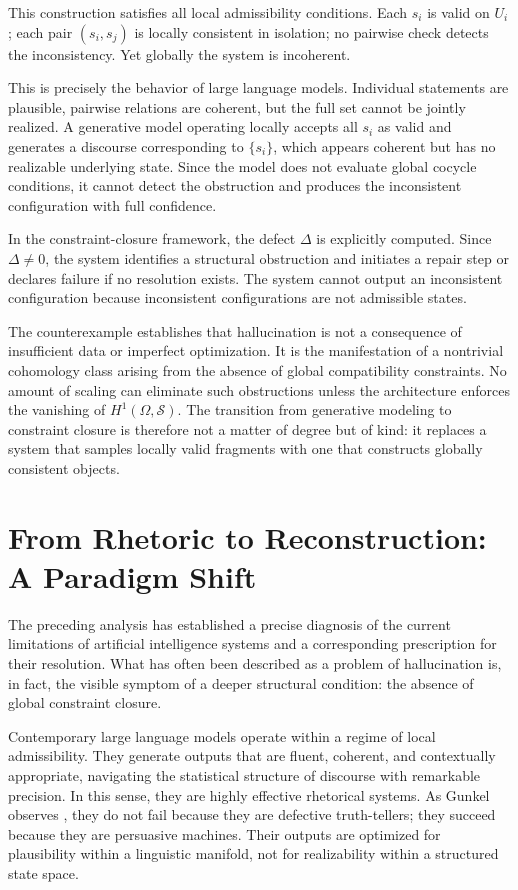 \documentclass[11pt, oneside]{article}
\begin{document}
This construction satisfies all local admissibility conditions. Each $s_i$ is valid on $U_i$; each pair $(s_i, s_j)$ is locally consistent in isolation; no pairwise check detects the inconsistency. Yet globally the system is incoherent.

This is precisely the behavior of large language models. Individual statements are plausible, pairwise relations are coherent, but the full set cannot be jointly realized. A generative model operating locally accepts all $s_i$ as valid and generates a discourse corresponding to $\{s_i\}$, which appears coherent but has no realizable underlying state. Since the model does not evaluate global cocycle conditions, it cannot detect the obstruction and produces the inconsistent configuration with full confidence.

In the constraint-closure framework, the defect $\Delta$ is explicitly computed. Since $\Delta \neq 0$, the system identifies a structural obstruction and initiates a repair step or declares failure if no resolution exists. The system cannot output an inconsistent configuration because inconsistent configurations are not admissible states.

The counterexample establishes that hallucination is not a consequence of insufficient data or imperfect optimization. It is the manifestation of a nontrivial cohomology class arising from the absence of global compatibility constraints. No amount of scaling can eliminate such obstructions unless the architecture enforces the vanishing of $H^1(\Omega, \mathcal{S})$. The transition from generative modeling to constraint closure is therefore not a matter of degree but of kind: it replaces a system that samples locally valid fragments with one that constructs globally consistent objects.

\section{From Rhetoric to Reconstruction: A Paradigm Shift}

The preceding analysis has established a precise diagnosis of the current limitations of artificial intelligence systems and a corresponding prescription for their resolution. What has often been described as a problem of hallucination is, in fact, the visible symptom of a deeper structural condition: the absence of global constraint closure.

Contemporary large language models operate within a regime of local admissibility. They generate outputs that are fluent, coherent, and contextually appropriate, navigating the statistical structure of discourse with remarkable precision. In this sense, they are highly effective rhetorical systems. As Gunkel observes \cite{gunkel2026}, they do not fail because they are defective truth-tellers; they succeed because they are persuasive machines. Their outputs are optimized for plausibility within a linguistic manifold, not for realizability within a structured state space.
\end{document}
